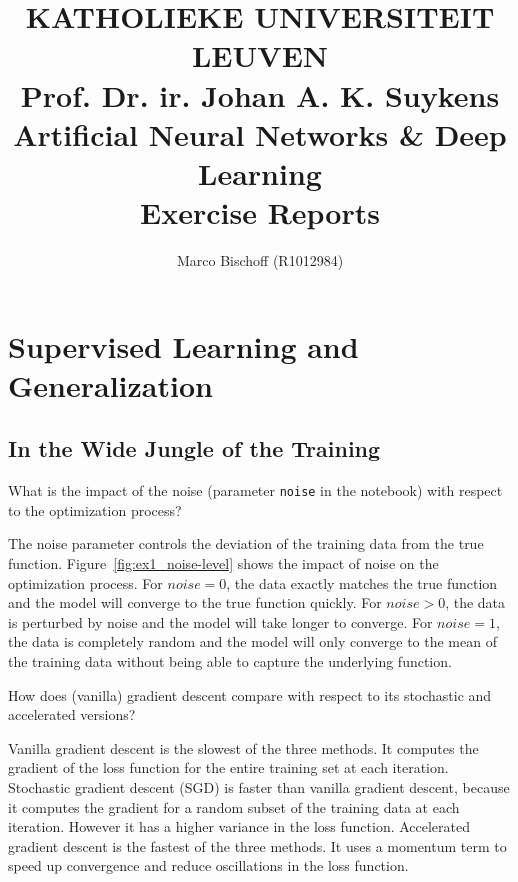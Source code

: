 \documentclass{article}
\title{
  \vspace*{2cm}
  {\bf \scriptsize
    KATHOLIEKE UNIVERSITEIT LEUVEN \\\vspace{0.3cm}
    Prof. Dr. ir. Johan A. K. Suykens
  } \vspace{2cm} \\
  Artificial Neural Networks \& Deep Learning \\
  {\large Exercise Reports}
}
\author{Marco Bischoff (R1012984)}
\newenvironment{task}[1]{
  \begin{tcolorbox}[
    colback=highlight!5!white,
    colframe=highlight,
    title={Task #1}
  ]
}{
  \end{tcolorbox}
}
\begin{document}
\pagestyle{headings}

\maketitle
\newpage

\tableofcontents
\newpage



\section{Supervised Learning and Generalization}
\label{ex:1}

\setcounter{subsection}{2}
\subsection{In the Wide Jungle of the Training}
\label{task:1.3}


\begin{task}{1.3.1}
  What is the impact of the noise (parameter \texttt{noise} in the notebook) with respect to the
  optimization process?
\end{task}

The noise parameter controls the deviation of the training data from the true function.
Figure~\ref{fig:ex1_noise-level} shows the impact of noise on the optimization process. For $noise =
  0$, the data exactly matches the true function and the model will converge to the true function
quickly. For $noise > 0$, the data is perturbed by noise and the model will take longer to converge.
For $noise = 1$, the data is completely random and the model will only converge to the mean of the
training data without being able to capture the underlying function.


\begin{task}{1.3.2}
  How does (vanilla) gradient descent compare with respect to its stochastic and accelerated
  versions?
\end{task}

Vanilla gradient descent is the slowest of the three methods. It computes the gradient of the loss
function for the entire training set at each iteration. Stochastic gradient descent (SGD) is faster
than vanilla gradient descent, because it computes the gradient for a random subset of the training
data at each iteration. However it has a higher variance in the loss function. Accelerated gradient
descent is the fastest of the three methods. It uses a momentum term to speed up convergence and
reduce oscillations in the loss function.
\end{document}
